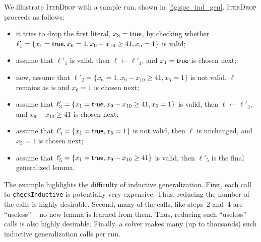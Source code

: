

We illustrate \textsc{IterDrop} with a sample run,  shown in
\cref{fig:spc_ind_gen}. \textsc{IterDrop} proceeds as follows:
\begin{itemize}
\item it tries to drop the first literal, $x_3 = \textsf{true}$, by checking whether
  $\ell'_1=\{x_1 = \textsf{true}, x_6 = 1, x_9 - x_{10} \geq 41, x_5 = 1\}$ is
  valid;
\item assume that $\ell'_1$ is valid, then $\ell \gets \ell'_1$, and $x_1 = \textsf{true}$ is chosen next;
\item now, assume that $\ell'_2 = \{x_6 = 1, x_9 - x_{10} \geq 41, x_5 = 1\}$ is
  not valid. $\ell$ remains as is and $x_6 = 1$ is chosen next;
\item assume that $\ell'_3 = \{ x_1 = \textsf{true}, x_9 - x_{10} \geq 41, x_5 = 1\}$ is valid, then
  $\ell \gets \ell'_3$, and $x_9 - x_{10} \geq 41$ is chosen next;
\item assume that $\ell'_4 = \{x_1 = \textsf{true}, x_5 = 1\}$ is not valid,
  then $\ell$ is unchanged, and $x_5 = 1$ is chosen next;
\item assume that $\ell'_5 = \{ x_1 = \textsf{true}, x_9 - x_{10} \geq 41\}$ is valid, then
  $\ell'_5$ is the final generalized lemma.
\end{itemize}
The example highlights the difficulty of inductive generalization. First, each
call to \texttt{checkInductive} is potentially very expensive. Thus, reducing
the number of the calls is highly desirable. Second, many of the calls, like
steps~2 and~4 are ``useless'' -- no new lemma is learned from them. Thus,
reducing such ``useless'' calls is also highly desirable. Finally, a solver
makes many (up to thousands) such inductive generalization calls per run.

